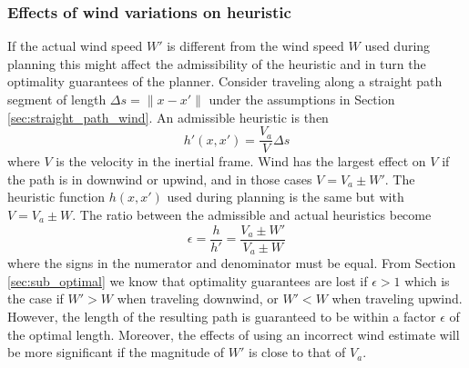 \subsubsection{Effects of wind variations on heuristic}
If the actual wind speed $W'$ is different from the wind speed $W$ used during planning this 
might affect the admissibility of the heuristic and in turn the optimality guarantees of the planner. 
Consider traveling along a straight path segment of length $\Delta s=\|x-x'\|$ under the assumptions in Section \ref{sec:straight_path_wind}. 
An admissible heuristic is then 
\begin{equation}
    h'(x, x')=\frac{V_a}{V}\Delta s
\end{equation}
where $V$ is the velocity in the inertial frame. Wind has the largest effect on $V$ if the path is in downwind or upwind, and in those cases $V=V_a\pm W'$. The 
heuristic function $h(x, x')$ used during planning is the same but with $V=V_a\pm W$. The ratio between the admissible and actual heuristics become 
\begin{equation}\label{eq:wind_heuristic_eps}
    \epsilon = \frac{h}{h'} = \frac{V_a \pm W'}{V_a \pm W}
\end{equation}
where the signs in the numerator and denominator must be equal. From Section \ref{sec:sub_optimal} we know that optimality guarantees are lost if 
$\epsilon>1$ which is the case if $W'>W$ when traveling downwind, or $W'<W$ when traveling upwind. However, the length of the resulting path is 
guaranteed to be within a factor $\epsilon$ of the optimal length. Moreover, the effects of using an incorrect wind estimate will be more significant if the 
magnitude of $W'$ is close to that of $V_a$.